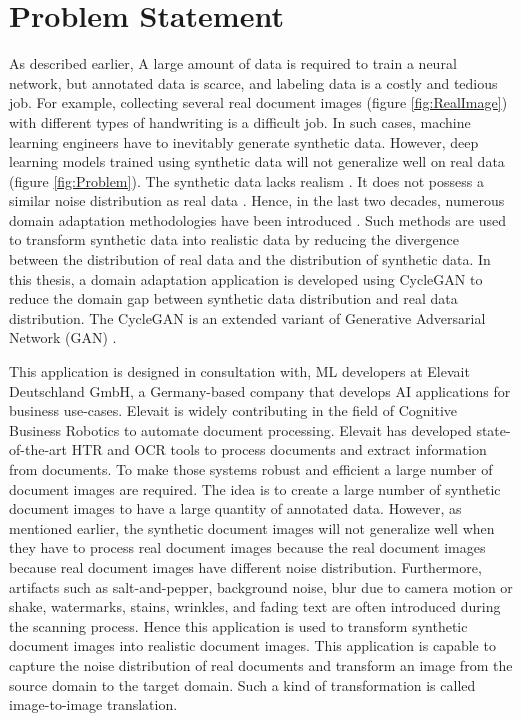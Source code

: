 \section{Problem Statement}\label{ProblemStatement}

As described earlier, A large amount of data is required to train a neural network, but annotated data is scarce, and labeling data is a costly and tedious job. For example, collecting several real document images (figure \ref{fig:RealImage}) with different types of handwriting is a difficult job. In such cases, machine learning engineers have to inevitably generate synthetic data. However, deep learning models trained using synthetic data will not generalize well on real data \cite{8978087} (figure \ref{fig:Problem}). The synthetic data lacks realism \cite{8978087}. It does not possess a similar noise distribution as real data \cite{8978087}. Hence, in the last two decades, numerous domain adaptation methodologies have been introduced \cite{8978011}. Such methods are used to transform synthetic data into realistic data by reducing the divergence between the distribution of real data and the distribution of synthetic data. In this thesis, a domain adaptation application is developed using \ac{CycleGAN} \cite{zhu2020unpaired} to reduce the domain gap between synthetic data distribution and real data distribution. The \ac{CycleGAN} is an extended variant of Generative Adversarial Network (\ac{GAN}) \cite{goodfellow2014generative}. 


This application is designed in consultation with, \ac{ML} developers at Elevait Deutschland GmbH, a Germany-based company that develops \ac{AI} applications for business use-cases. Elevait is widely contributing in the field of Cognitive Business Robotics \cite{Metta2012} to automate document processing. Elevait has developed state-of-the-art \ac{HTR} and \ac{OCR} tools to process documents and extract information from documents. To make those systems robust and efficient a large number of document images are required. The idea is to create a large number of synthetic document images to have a large quantity of annotated data. However, as mentioned earlier, the synthetic document images will not generalize well when they have to process real document images because the real document images because real document images have different noise distribution. Furthermore, artifacts such as salt-and-pepper, background noise, blur due to camera motion or shake, watermarks, stains, wrinkles, and fading text are often introduced during the scanning process. Hence this application is used to transform synthetic document images into realistic document images. This application is capable to capture the noise distribution of real documents and transform an image from the source domain to the target domain. Such a kind of transformation is called image-to-image translation.


